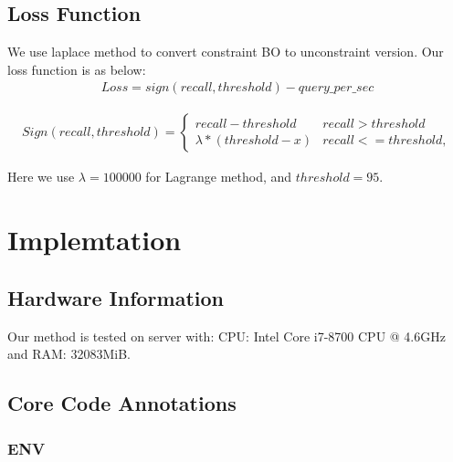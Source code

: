 \documentclass{ol-softwaremanual}
\begin{document}
\subsection{Loss Function}

We use laplace method to convert constraint BO to unconstraint version.
Our loss function is as below:  
\begin{align}
Loss = sign(recall, threshold) - query\_per\_sec 
\end{align}


\begin{align}
Sign(recall, threshold) = 
\begin{cases}  
recall - threshold & recall>threshold \\
\lambda * (threshold - x) & recall<=threshold,
\end{cases}
\end{align}

Here we use $\lambda = 100000$ for Lagrange method, and $threshold = 95$.

\section{Implemtation}
\subsection{Hardware Information}
Our method is tested on server with:
CPU: Intel Core i7-8700 CPU @ 4.6GHz and 
RAM: 32083MiB.

\subsection{Core Code Annotations}
\subsubsection{ENV}
\end{document}
